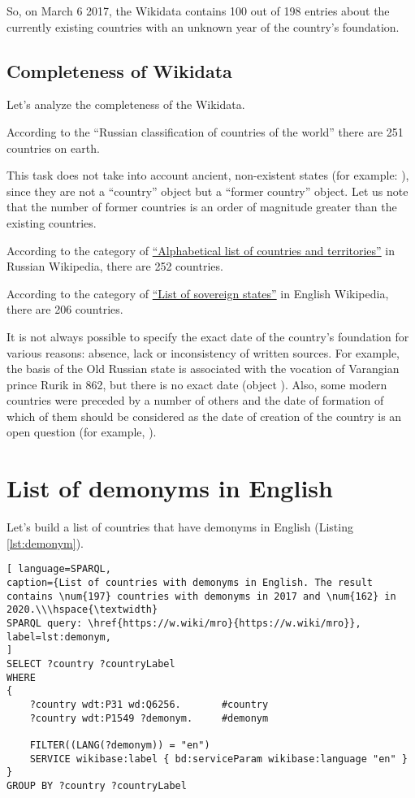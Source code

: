 
So, on March 6 2017, the Wikidata contains 100 out of 198 entries about the currently existing countries with an unknown year of the country's foundation.

\subsection{Completeness of Wikidata}

Let's analyze the completeness of the Wikidata.

According to the ``Russian classification of countries of the world'' there are 251 countries on earth.

This task does not take into account ancient, non-existent states (for example: ), since they are not a ``country'' object but a ``former country'' object. Let us note that the number of former countries is an order of magnitude greater than the existing countries.

According to the category of \href{https://w.wiki/dWv}{``Alphabetical list of countries and territories''} in Russian Wikipedia, there are 252 countries.

According to the category of \href{https://en.wikipedia.org/wiki/List_of_sovereign_states}{``List of sovereign states''} in English Wikipedia, there are 206 countries.

It is not always possible to specify the exact date of the country's foundation for various reasons: absence, lack or inconsistency of written sources. For example, the basis of the Old Russian state is associated with the vocation of Varangian prince Rurik in 862, but there is no exact date (object ). Also, some modern countries were preceded by a number of others and the date of formation of which of them should be considered as the date of creation of the country is an open question (for example, ).


\section{List of demonyms in English}

Let's build a list of countries that have demonyms in English (Listing \ref{lst:demonym}).

\begin{lstlisting}[ language=SPARQL, 
caption={List of countries with demonyms in English. The result contains \num{197} countries with demonyms in 2017 and \num{162} in 2020.\\\hspace{\textwidth}
SPARQL query: \href{https://w.wiki/mro}{https://w.wiki/mro}},
label=lst:demonym, 
]
SELECT ?country ?countryLabel 
WHERE
{
	?country wdt:P31 wd:Q6256.       #country
	?country wdt:P1549 ?demonym.     #demonym

	FILTER((LANG(?demonym)) = "en")
	SERVICE wikibase:label { bd:serviceParam wikibase:language "en" }
}
GROUP BY ?country ?countryLabel
\end{lstlisting}


